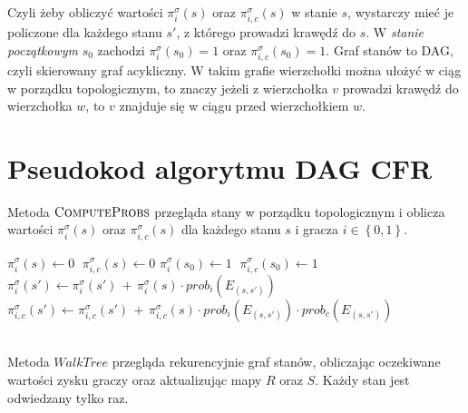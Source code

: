 \documentclass[magisterska]{pracamgr}
\begin{document}
\noindent
Czyli żeby obliczyć wartości $\pi_i^{\sigma}(s)$ oraz $\pi_{i, c}^{\sigma}(s)$ w stanie $s$, wystarczy
mieć je policzone dla każdego stanu $s'$, z którego prowadzi krawędź do $s$. W \emph{stanie początkowym} $s_0$ zachodzi
$\pi_i^{\sigma}(s_0) = 1$ oraz $\pi_{i, c}^{\sigma}(s_0) = 1$. Graf stanów to DAG, czyli
skierowany graf acykliczny. W takim grafie wierzchołki można ułożyć w ciąg w porządku topologicznym, to znaczy
jeżeli z wierzchołka $v$ prowadzi krawędź do wierzchołka $w$, to $v$ znajduje się w ciągu przed wierzchołkiem $w$.

\section{Pseudokod algorytmu DAG CFR}

\noindent
Metoda $\Call{ComputeProbs}{}$ przegląda stany w porządku topologicznym i oblicza wartości $\pi_i^{\sigma}(s)$ oraz $\pi_{i, c}^{\sigma}(s)$
dla każdego stanu $s$ i gracza $i \in \left\{0, 1\right\}$. \\ 

\begin{algorithmic}
        \State $\pi_i^{\sigma}(s) \gets 0$ $ \; \pi_{i,c}^{\sigma}(s) \gets 0$
        \State $\pi_i^{\sigma}(s_0) \gets 1$ $ \; \pi_{i,c}^{\sigma}(s_0) \gets 1$
                \State $\pi_i^{\sigma}(s') \gets \pi_i^{\sigma}(s') \, + \, \pi_i^{\sigma}(s) \cdot prob_i(E_{(s, s')})$ 
                \State $\pi_{i,c}^{\sigma}(s') \gets \pi_{i,c}^{\sigma}(s') \, + \, \pi_{i,c}^{\sigma}(s) \cdot prob_i(E_{(s, s')}) \cdot prob_c(E_{(s, s')})$ 
            \EndFor
        \EndFor
    \EndFunction
\end{algorithmic}

$\,$ \\

\noindent
Metoda $WalkTree$ przegląda rekurencyjnie graf stanów, obliczając oczekiwane wartości zysku graczy oraz
aktualizując mapy $R$ oraz $S$. Każdy stan jest odwiedzany tylko raz. \\
\end{document}
